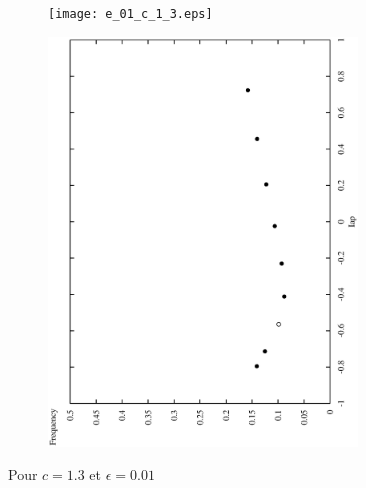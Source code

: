 \documentclass[12pt,a4paper,onecolumn]{article}
\begin{document}
\begin{figure}[htb]\ContinuedFloat
	\centering
	\begin{subfigure}[b]{\textwidth}
		\texttt{[image: e\_01\_c\_1\_3.eps]}
	\end{subfigure}

	\begin{subfigure}[b]{\textwidth}
		\includegraphics[angle = 270, width = 0.9\textwidth]{freq_c_1_3.eps}
	\end{subfigure}
	\caption{Pour $c = 1.3$ et $\epsilon = 0.01$}
\end{figure}
\end{document}
